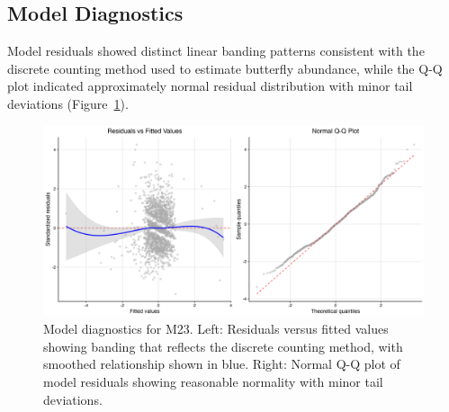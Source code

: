 \subsection{Model Diagnostics}

Model residuals showed distinct linear banding patterns consistent with the discrete counting method used to estimate butterfly abundance, while the Q-Q plot indicated approximately normal residual distribution with minor tail deviations (Figure~\ref{fig:diagnostics}).

\begin{figure}[htbp]
\centering
\includegraphics[width=\textwidth]{figures/results/combined_diagnostics.png}
\caption{Model diagnostics for M23. Left: Residuals versus fitted values showing banding that reflects the discrete counting method, with smoothed relationship shown in blue. Right: Normal Q-Q plot of model residuals showing reasonable normality with minor tail deviations.}\label{fig:diagnostics}
\end{figure}

